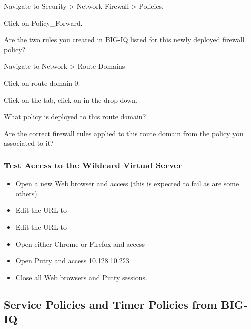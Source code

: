 \documentclass[letterpaper,10pt,english]{sphinxmanual}
\begin{document}
Navigate to Security \textgreater{} Network Firewall \textgreater{} Policies.

Click on Policy\_Forward.

Are the two rules you created in BIG-IQ listed for this newly deployed
firewall policy?


Navigate to Network \textgreater{} Route Domains

Click on route domain 0.

Click on the  tab, click on  in the drop down.

What policy is deployed to this route domain?

Are the correct firewall rules applied to this route domain from the
policy you associated to it?



\subsubsection{Test Access to the Wildcard Virtual Server}
\label{\detokenize{class1/module5/lab1:test-access-to-the-wildcard-virtual-server}}\begin{itemize}
\item {} 
Open a new Web browser and access
 (this is
expected to fail as are some others)

\item {} 
Edit the URL to 

\item {} 
Edit the URL to 

\item {} 
Open either Chrome or Firefox and access

\item {} 
Open Putty and access 10.128.10.223

\item {} 
Close all Web browsers and Putty sessions.

\end{itemize}


\subsection{Service Policies and Timer Policies from BIG-IQ}
\label{\detokenize{class1/module5/lab2::doc}}\label{\detokenize{class1/module5/lab2:service-policies-and-timer-policies-from-big-iq}}
\end{document}

